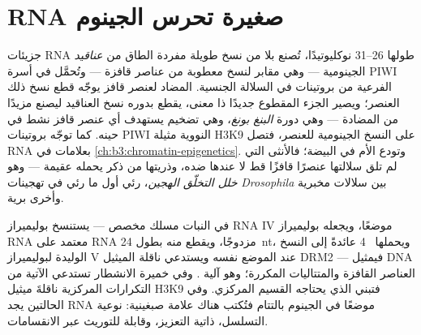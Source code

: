 \section{RNA صغيرة تحرس الجينوم}

\begin{definition}\label{def:b3:rna-regulation:pirna}
\emph{} جزيئات RNA طولها \numrange{26}{31} نوكليوتيدًا، تُصنع بلا
 من نسخ طويلة مفردة الطاق من \emph{عناقيد } الجينومية
--- وهي مقابر لنسخ معطوبة من عناصر قافزة --- وتُحمَّل في أسرة PIWI
الفرعية من بروتينات  في السلالة الجنسية.  المضاد لعنصر
قافز يوجّه قطع نسخ ذلك العنصر؛ ويصير الجزء المقطوع  جديدًا ذا
معنى، يقطع بدوره نسخ العناقيد ليصنع مزيدًا من  المضادة --- وهي
دورة \emph{البنغ بونغ}، وهي تضخيم يستهدف أي عنصر قافز نشط في حينه.
كما توجّه بروتينات PIWI النووية مثيلة H3K9  على النسخ
الجينومية للعنصر، فتصل RNA بعلامات  في
\cref{ch:b3:chromatin-epigenetics}. وتودع الأم  في البيضة؛
فالأنثى التي لم تلق سلالتها عنصرًا قافزًا قط لا  عندها ضده،
وذريتها من ذكر يحمله عقيمة --- وهو
\emph{خلل التخلّق الهجين}، رئي أول ما رئي في تهجينات \emph{Drosophila}
بين سلالات مخبرية وأخرى برية.
\end{definition}

\begin{proposition}\label{prop:b3:rna-regulation:rddm}
في النبات مسلك مخصص --- يستنسخ بوليميراز RNA IV موضعًا، ويجعله
بوليميراز RNA معتمد على RNA مزدوجًا، ويقطع  منه  بطول
\qty{24}{nt}، ويحملها ~4 عائدةً إلى النسخ الوليدة لبوليميراز
V عند الموضع نفسه ويستدعي ناقلة الميثيل DRM2 --- فيمثيل DNA العناصر
القافزة والمتتاليات المكررة؛ وهو آلية . وفي خميرة
الانشطار تستدعي  الآتية من التكرارات المركزية ناقلةَ ميثيل H3K9
فتبني  الذي يحتاجه القسيم المركزي. وفي الحالتين يجد
RNA موضعًا في الجينوم بالتتام فتُكتب هناك علامة صبغينية: نوعية
التسلسل، ذاتية التعزيز، وقابلة للتوريث عبر الانقسامات.
\end{proposition}

